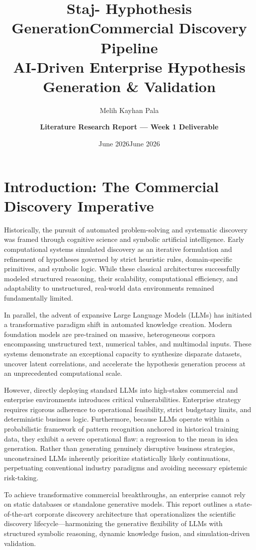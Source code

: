 \documentclass[11pt, a4paper]{article}
\title{Staj- Hyphothesis Generation}
\author{Melih Kayhan Pala}
\date{June 2026}
\title{\textbf{\Huge Commercial Discovery Pipeline}\\[0.5em] 
\Large AI-Driven Enterprise Hypothesis Generation \& Validation}
\author{\textbf{Literature Research Report --- Week 1 Deliverable}}
\date{June 2026}
\begin{document}
\maketitle
\onehalfspacing
\vspace{1em}

\section{Introduction: The Commercial Discovery Imperative}

Historically, the pursuit of automated problem-solving and systematic discovery was framed through cognitive science and symbolic artificial intelligence. Early computational systems simulated discovery as an iterative formulation and refinement of hypotheses governed by strict heuristic rules, domain-specific primitives, and symbolic logic. While these classical architectures successfully modeled structured reasoning, their scalability, computational efficiency, and adaptability to unstructured, real-world data environments remained fundamentally limited.

In parallel, the advent of expansive Large Language Models (LLMs) has initiated a transformative paradigm shift in automated knowledge creation. Modern foundation models are pre-trained on massive, heterogeneous corpora encompassing unstructured text, numerical tables, and multimodal inputs. These systems demonstrate an exceptional capacity to synthesize disparate datasets, uncover latent correlations, and accelerate the hypothesis generation process at an unprecedented computational scale.

However, directly deploying standard LLMs into high-stakes commercial and enterprise environments introduces critical vulnerabilities. Enterprise strategy requires rigorous adherence to operational feasibility, strict budgetary limits, and deterministic business logic. Furthermore, because LLMs operate within a probabilistic framework of pattern recognition anchored in historical training data, they exhibit a severe operational flaw: a regression to the mean in idea generation. Rather than generating genuinely disruptive business strategies, unconstrained LLMs inherently prioritize statistically likely continuations, perpetuating conventional industry paradigms and avoiding necessary epistemic risk-taking.

To achieve transformative commercial breakthroughs, an enterprise cannot rely on static databases or standalone generative models. This report outlines a state-of-the-art corporate discovery architecture that operationalizes the scientific discovery lifecycle---harmonizing the generative flexibility of LLMs with structured symbolic reasoning, dynamic knowledge fusion, and simulation-driven validation.
\end{document}
